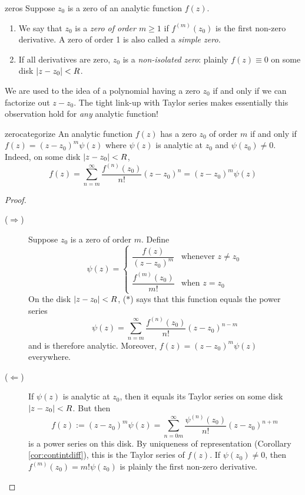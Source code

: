 
\begin{defn}{}{zeros}
	Suppose $z_0$ is a zero of an analytic function $f(z)$.
	\begin{enumerate}\itemsep0pt
	  \item We say that $z_0$ is a \emph{zero of order $m\ge 1$} if $f^{(m)}(z_0)$ is the first non-zero derivative. A zero of order 1 is also called a \emph{simple zero.}
 		\item	If all derivatives are zero, $z_0$ is a \emph{non-isolated zero}: plainly $f(z)\equiv 0$ on some disk $\left| z-z_0\right|<R$.
	\end{enumerate} 
\end{defn}



We are used to the idea of a polynomial having a zero $z_0$ if and only if we can factorize out $z-z_0$. The tight link-up with Taylor series makes essentially this observation hold for \emph{any} analytic function!

\begin{thm}{}{zerocategorize}
	An analytic function $f(z)$ has a zero $z_0$ of order $m$ if and only if $f(z)=(z-z_0)^m\psi(z)$ where $\psi(z)$ is analytic at $z_0$ and $\psi(z_0)\neq 0$. Indeed, on some disk $\left| z-z_0\right|<R$,
	\[
		f(z)=\sum\limits_{n=m}^\infty\frac{f^{(n)}(z_0)}{n!}(z-z_0)^{n}
		=(z-z_0)^{m}\psi(z)
	\]
\end{thm}

\begin{proof}
	\begin{description}
		\item[\normalfont ($\Rightarrow$)] Suppose $z_0$ is a zero of order $m$. Define
		\[
			\psi(z)=
			\begin{cases}
				\dfrac{f(z)}{(z-z_0)^m}&\text{whenever }z\neq z_0\\[10pt]
				\dfrac{f^{(m)}(z_0)}{m!}&\text{when }z=z_0
			\end{cases}
		\]
		On the disk $\left| z-z_0\right|<R$, ($\ast$) says that this function equals the power series
		\[
			\psi(z)=\sum\limits_{n=m}^\infty\frac{f^{(n)}(z_0)}{n!}(z-z_0)^{n-m}
		\]
		and is therefore analytic. Moreover, $f(z)=(z-z_0)^m\psi(z)$ everywhere.
		\item[\normalfont ($\Leftarrow$)] If $\psi(z)$ is analytic at $z_0$, then it equals its Taylor series on some disk $\left| z-z_0\right|<R$. But then
		\[
			f(z):=(z-z_0)^m\psi(z) %
			=\sum\limits_{n=0m}^\infty\frac{\psi^{(n)}(z_0)}{n!}(z-z_0)^{n+m}
		\]
		is a power series on this disk. By uniqueness of representation (Corollary \ref{cor:contintdiff}), this is the Taylor series of $f(z)$. If $\psi(z_0)\neq 0$, then $f^{(m)}(z_0)=m!\psi(z_0)$ is plainly the first non-zero derivative. \qedhere
	\end{description}
\end{proof}

